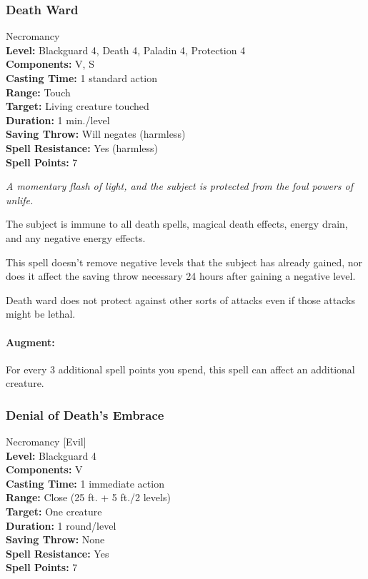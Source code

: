 \subsubsection{Death Ward}
\label{Spell:DeathWard}
Necromancy
\\ \textbf{Level:} Blackguard 4, Death 4, Paladin 4, Protection 4
\\ \textbf{Components:} V, S
\\ \textbf{Casting Time:} 1 standard action
\\ \textbf{Range:} Touch
\\ \textbf{Target:} Living creature touched
\\ \textbf{Duration:} 1 min./level
\\ \textbf{Saving Throw:} Will negates (harmless)
\\ \textbf{Spell Resistance:} Yes (harmless)
\\ \textbf{Spell Points:} 7

\emph{A momentary flash of light, and the subject is protected from the foul powers of unlife.}

The subject is immune to all death spells, magical death effects, energy drain, and any negative energy effects.

This spell doesn't remove negative levels that the subject has already gained, 
nor does it affect the saving throw necessary 24 hours after gaining a negative level.

Death ward does not protect against other sorts of attacks even if those attacks might be lethal.

\paragraph{Augment:} For every 3 additional spell points you spend, this spell can affect an additional creature.
\subsubsection{Denial of Death's Embrace}
\label{Spell:DenialOfDeathsEmbrace}
Necromancy [Evil]
\\ \textbf{Level:} Blackguard 4
\\ \textbf{Components:} V
\\ \textbf{Casting Time:} 1 immediate action
\\ \textbf{Range:} Close (25 ft. + 5 ft./2 levels)
\\ \textbf{Target:} One creature
\\ \textbf{Duration:} 1 round/level
\\ \textbf{Saving Throw:} None
\\ \textbf{Spell Resistance:} Yes
\\ \textbf{Spell Points:} 7

